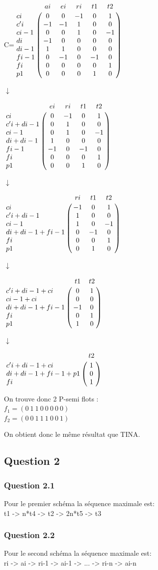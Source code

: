 \begin{center}


{\Huge C}\qquad =\qquad $\bordermatrix{
&ai&ei&ri&t1&t2\cr
ci&0&0&-1&0&1\cr
c'i&-1&-1&1&0&0\cr
ci-1&0&0&1&0&-1\cr
di&-1&0&0&0&0\cr
di-1&1&1&0&0&0\cr
fi-1&0&-1&0&-1&0\cr
fi&0&0&0&0&1\cr
p1&0&0&0&1&0\cr
}$

{\Huge $\downarrow$}

$\bordermatrix{
&ei&ri&t1&t2\cr
ci&0&-1&0&1\cr
c'i+di-1&0&1&0&0\cr
ci-1&0&1&0&-1\cr
di+di-1&1&0&0&0\cr
fi-1&-1&0&-1&0\cr
fi&0&0&0&1\cr
p1&0&0&1&0\cr
}$

{\Huge $\downarrow$}

$\bordermatrix{
&ri&t1&t2\cr
ci&-1&0&1\cr
c'i+di-1&1&0&0\cr
ci-1&1&0&-1\cr
di+di-1+fi-1&0&-1&0\cr
fi&0&0&1\cr
p1&0&1&0\cr
}$

{\Huge $\downarrow$}

$\bordermatrix{
&t1&t2\cr
c'i+di-1+ci&0&1\cr
ci-1+ci&0&0\cr
di+di-1+fi-1&-1&0\cr
fi&0&1\cr
p1&1&0\cr
}$

{\Huge $\downarrow$}

$\bordermatrix{
&t2\cr
c'i+di-1+ci&1\cr
di+di-1+fi-1+p1&0\cr
fi&1\cr
}$

\vspace{1cm}

On trouve donc 2 P-semi flots :\\
$f_1 = (0\ 1\ 1\ 0\ 0\ 0\ 0\ 0)$\\
$f_2 = (0\ 0\ 1\ 1\ 1\ 0\ 0\ 1)$\\

\end{center}

On obtient donc le même résultat que TINA.


\subsection{Question 2}
\subsubsection{Question 2.1}
Pour le premier schéma la séquence maximale est:\\
t1 -> n*t4 -> t2 -> 2n*t5 -> t3

\subsubsection{Question 2.2}
Pour le second schéma la séquence maximale est:\\
ri -> ai -> ri-1 -> ai-1 -> ... -> ri-n -> ai-n


